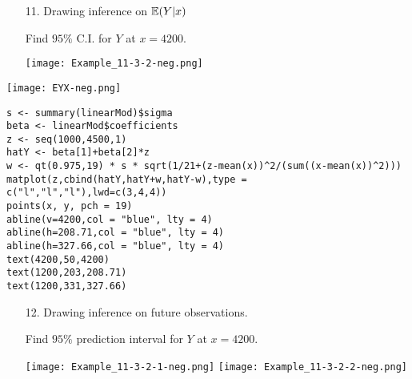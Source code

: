 \begin{frame}[fragile]

	\begin{enumerate}
		\item[11.] Drawing inference on $\mathbb{E}(Y|x)$\\[1em]
		\item[] Find $95\%$ C.I. for $Y$ at $x=4200$.
			\vfill
		\item[]
			\begin{center}
\texttt{[image: Example\_11-3-2-neg.png]}
			\end{center}
	\end{enumerate}
\end{frame}
\begin{frame}[fragile]
\begin{center}
\texttt{[image: EYX-neg.png]}
\end{center}
\end{frame}
\begin{frame}[fragile]
	\begin{center}
	\begin{minipage}{0.8\textwidth}
\begin{lstlisting}
s <- summary(linearMod)$sigma
beta <- linearMod$coefficients
z <- seq(1000,4500,1)
hatY <- beta[1]+beta[2]*z
w <- qt(0.975,19) * s * sqrt(1/21+(z-mean(x))^2/(sum((x-mean(x))^2)))
matplot(z,cbind(hatY,hatY+w,hatY-w),type = c("l","l","l"),lwd=c(3,4,4))
points(x, y, pch = 19)
abline(v=4200,col = "blue", lty = 4)
abline(h=208.71,col = "blue", lty = 4)
abline(h=327.66,col = "blue", lty = 4)
text(4200,50,4200)
text(1200,203,208.71)
text(1200,331,327.66)
\end{lstlisting}
\end{minipage}
	\end{center}
\end{frame}
\begin{frame}[fragile]

	\begin{enumerate}
		\item[12.] Drawing inference on future observations.\\[1em]
		\item[] Find $95\%$ prediction interval for $Y$ at $x=4200$.
			\vfill
		\item[]
\begin{center}
\texttt{[image: Example\_11-3-2-1-neg.png]}
\texttt{[image: Example\_11-3-2-2-neg.png]}
\end{center}
	\end{enumerate}
\end{frame}
